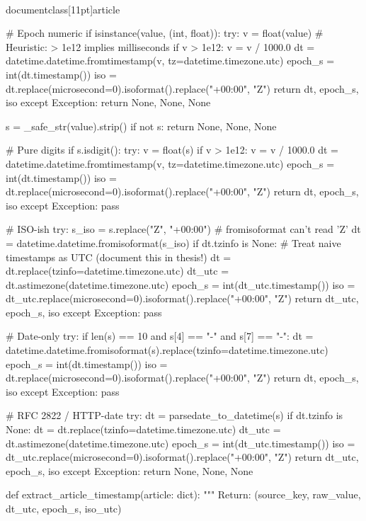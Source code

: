 \\documentclass[11pt]{article}
\begin{document}
\begin{CodeBlock}
    # Epoch numeric
    if isinstance(value, (int, float)):
        try:
            v = float(value)
            # Heuristic: > 1e12 implies milliseconds
            if v > 1e12:
                v = v / 1000.0
            dt = datetime.datetime.fromtimestamp(v, tz=datetime.timezone.utc)
            epoch_s = int(dt.timestamp())
            iso = dt.replace(microsecond=0).isoformat().replace("+00:00", "Z")
            return dt, epoch_s, iso
        except Exception:
            return None, None, None

    s = _safe_str(value).strip()
    if not s:
        return None, None, None

    # Pure digits
    if s.isdigit():
        try:
            v = float(s)
            if v > 1e12:
                v = v / 1000.0
            dt = datetime.datetime.fromtimestamp(v, tz=datetime.timezone.utc)
            epoch_s = int(dt.timestamp())
            iso = dt.replace(microsecond=0).isoformat().replace("+00:00", "Z")
            return dt, epoch_s, iso
        except Exception:
            pass

    # ISO-ish
    try:
        s_iso = s.replace("Z", "+00:00")  # fromisoformat can't read 'Z'
        dt = datetime.datetime.fromisoformat(s_iso)
        if dt.tzinfo is None:
            # Treat naive timestamps as UTC (document this in thesis!)
            dt = dt.replace(tzinfo=datetime.timezone.utc)
        dt_utc = dt.astimezone(datetime.timezone.utc)
        epoch_s = int(dt_utc.timestamp())
        iso = dt_utc.replace(microsecond=0).isoformat().replace("+00:00", "Z")
        return dt_utc, epoch_s, iso
    except Exception:
        pass

    # Date-only
    try:
        if len(s) == 10 and s[4] == "-" and s[7] == "-":
            dt = datetime.datetime.fromisoformat(s).replace(tzinfo=datetime.timezone.utc)
            epoch_s = int(dt.timestamp())
            iso = dt.replace(microsecond=0).isoformat().replace("+00:00", "Z")
            return dt, epoch_s, iso
    except Exception:
        pass

    # RFC 2822 / HTTP-date
    try:
        dt = parsedate_to_datetime(s)
        if dt.tzinfo is None:
            dt = dt.replace(tzinfo=datetime.timezone.utc)
        dt_utc = dt.astimezone(datetime.timezone.utc)
        epoch_s = int(dt_utc.timestamp())
        iso = dt_utc.replace(microsecond=0).isoformat().replace("+00:00", "Z")
        return dt_utc, epoch_s, iso
    except Exception:
        return None, None, None


def extract_article_timestamp(article: dict):
    """
    Return:
      (source_key, raw_value, dt_utc, epoch_s, iso_utc)


\end{CodeBlock}
\end{document}
